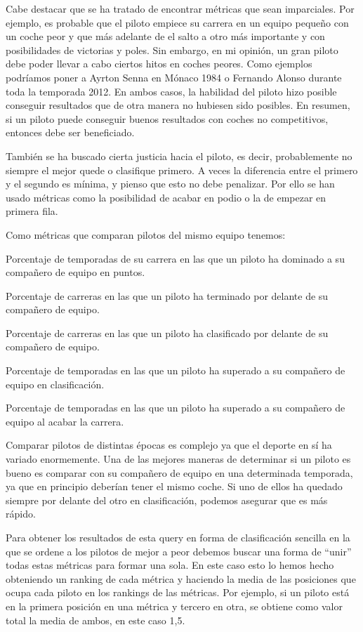 \documentclass[12pt,twoside,titlepage]{report}
\newcommand{\quotes}[1]{``#1''}
\begin{document}
Cabe destacar que se ha tratado de encontrar métricas que sean imparciales. Por ejemplo, es probable que el piloto empiece su carrera en un equipo pequeño con un coche peor y que más adelante de el salto a otro más importante y con posibilidades de victorias y poles. Sin embargo, en mi opinión, un gran piloto debe poder llevar a cabo ciertos hitos en coches peores. Como ejemplos podríamos poner a Ayrton Senna en Mónaco 1984 o Fernando Alonso durante toda la temporada 2012. En ambos casos, la habilidad del piloto hizo posible conseguir resultados que de otra manera no hubiesen sido posibles. En resumen, si un piloto puede conseguir buenos resultados con coches no competitivos, entonces debe ser beneficiado.

También se ha buscado cierta justicia hacia el piloto, es decir, probablemente no siempre el mejor quede o clasifique primero. A veces la diferencia entre el primero y el segundo es mínima, y pienso que esto no debe penalizar. Por ello se han usado métricas como la posibilidad de acabar en podio o la de empezar en primera fila.

Como métricas que comparan pilotos del mismo equipo tenemos:
\begin{compactitem}
	\item Porcentaje de temporadas de su carrera en las que un piloto ha dominado a su compañero de equipo en puntos.
	\item Porcentaje de carreras en las que un piloto ha terminado por delante de su compañero de equipo.
	\item Porcentaje de carreras en las que un piloto ha clasificado por delante de su compañero de equipo.
	\item Porcentaje de temporadas en las que un piloto ha superado a su compañero de equipo en clasificación.
	\item Porcentaje de temporadas en las que un piloto ha superado a su compañero de equipo al acabar la carrera.
\end{compactitem}

Comparar pilotos de distintas épocas es complejo ya que el deporte en sí ha variado enormemente. Una de las mejores maneras de determinar si un piloto es bueno es comparar con su compañero de equipo en una determinada temporada, ya que en principio deberían tener el mismo coche. Si uno de ellos ha quedado siempre por delante del otro en clasificación, podemos asegurar que es más rápido.

Para obtener los resultados de esta query en forma de clasificación sencilla en la que se ordene a los pilotos de mejor a peor debemos buscar una forma de \quotes{unir} todas estas métricas para formar una sola. En este caso esto lo hemos hecho obteniendo un ranking de cada métrica y haciendo la media de las posiciones que ocupa cada piloto en los rankings de las métricas. Por ejemplo, si un piloto está en la primera posición en una métrica y tercero en otra, se obtiene como valor total la media de ambos, en este caso 1,5.
\end{document}

